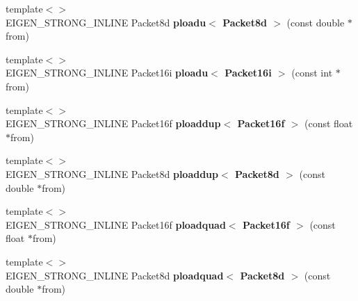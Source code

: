 \begin{DoxyCompactItemize}
\item 
\mbox{\label{namespace_eigen_1_1internal_a0d4a0a1c6f6dbaf6d1c251881e2da882}} 
{\footnotesize template$<$$>$ }\\E\+I\+G\+E\+N\+\_\+\+S\+T\+R\+O\+N\+G\+\_\+\+I\+N\+L\+I\+NE Packet8d {\bfseries ploadu$<$ Packet8d $>$} (const double $\ast$from)
\item 
\mbox{\label{namespace_eigen_1_1internal_a6e3e401aa89591a77206e3d005aeb723}} 
{\footnotesize template$<$$>$ }\\E\+I\+G\+E\+N\+\_\+\+S\+T\+R\+O\+N\+G\+\_\+\+I\+N\+L\+I\+NE Packet16i {\bfseries ploadu$<$ Packet16i $>$} (const int $\ast$from)
\item 
\mbox{\label{namespace_eigen_1_1internal_a2a1f2cd5dc74a9b1449cba8358f0f6e1}} 
{\footnotesize template$<$$>$ }\\E\+I\+G\+E\+N\+\_\+\+S\+T\+R\+O\+N\+G\+\_\+\+I\+N\+L\+I\+NE Packet16f {\bfseries ploaddup$<$ Packet16f $>$} (const float $\ast$from)
\item 
\mbox{\label{namespace_eigen_1_1internal_a76355ebb97e8bbccbf87b272f1ca9113}} 
{\footnotesize template$<$$>$ }\\E\+I\+G\+E\+N\+\_\+\+S\+T\+R\+O\+N\+G\+\_\+\+I\+N\+L\+I\+NE Packet8d {\bfseries ploaddup$<$ Packet8d $>$} (const double $\ast$from)
\item 
\mbox{\label{namespace_eigen_1_1internal_adbe320e757a049ed05d0f564bf9c6d6d}} 
{\footnotesize template$<$$>$ }\\E\+I\+G\+E\+N\+\_\+\+S\+T\+R\+O\+N\+G\+\_\+\+I\+N\+L\+I\+NE Packet16f {\bfseries ploadquad$<$ Packet16f $>$} (const float $\ast$from)
\item 
\mbox{\label{namespace_eigen_1_1internal_a0c021ba22df2ab0ea36b6497bc18994c}} 
{\footnotesize template$<$$>$ }\\E\+I\+G\+E\+N\+\_\+\+S\+T\+R\+O\+N\+G\+\_\+\+I\+N\+L\+I\+NE Packet8d {\bfseries ploadquad$<$ Packet8d $>$} (const double $\ast$from)
\item 
\mbox{\label{namespace_eigen_1_1internal_a26bc76d8e74f03a632c7c2b4a4965579}} 

\end{DoxyCompactItemize}
